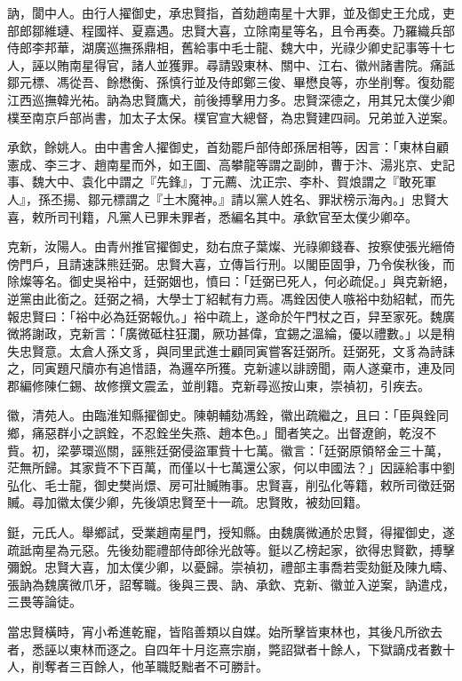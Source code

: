 \begin{pinyinscope}
訥，閬中人。由行人擢御史，承忠賢指，首劾趙南星十大罪，並及御史王允成，吏部郎鄒維璉、程國祥、夏嘉遇。忠賢大喜，立除南星等名，且令再奏。乃羅織兵部侍郎李邦華，湖廣巡撫孫鼎相，舊給事中毛士龍、魏大中，光祿少卿史記事等十七人，誣以賄南星得官，諸人並獲罪。尋請毀東林、關中、江右、徽州諸書院。痛詆鄒元標、馮從吾、餘懋衡、孫慎行並及侍郎鄭三俊、畢懋良等，亦坐削奪。復劾罷江西巡撫韓光祐。訥為忠賢鷹犬，前後搏擊用力多。忠賢深德之，用其兄太僕少卿樸至南京戶部尚書，加太子太保。樸官宣大總督，為忠賢建四祠。兄弟並入逆案。

承欽，餘姚人。由中書舍人擢御史，首劾罷戶部侍郎孫居相等，因言：「東林自顧憲成、李三才、趙南星而外，如王圖、高攀龍等謂之副帥，曹于汴、湯兆京、史記事、魏大中、袁化中謂之『先鋒』，丁元薦、沈正宗、李朴、賀烺謂之『敢死軍人』，孫丕揚、鄒元標謂之『土木魔神。』請以黨人姓名、罪狀榜示海內。」忠賢大喜，敕所司刊籍，凡黨人已罪未罪者，悉編名其中。承欽官至太僕少卿卒。

克新，汝陽人。由青州推官擢御史，劾右庶子葉燦、光祿卿錢春、按察使張光縉倚傍門戶，且請速誅熊廷弼。忠賢大喜，立傳旨行刑。以閣臣固爭，乃令俟秋後，而除燦等名。御史吳裕中，廷弼姻也，憤曰：「廷弼已死人，何必疏促。」與克新絕，逆黨由此銜之。廷弼之禍，大學士丁紹軾有力焉。馮銓因使人嗾裕中劾紹軾，而先報忠賢曰：「裕中必為廷弼報仇。」裕中疏上，遂命於午門杖之百，舁至家死。魏廣微將謝政，克新言：「廣微砥柱狂瀾，厥功甚偉，宜錫之溫綸，優以禮數。」以是稍失忠賢意。太倉人孫文豸，與同里武進士顧同寅嘗客廷弼所。廷弼死，文豸為詩誄之，同寅題尺牘亦有追惜語，為邏卒所獲。克新遽以誹謗聞，兩人遂棄市，連及同郡編修陳仁錫、故修撰文震孟，並削籍。克新尋巡按山東，崇禎初，引疾去。

徽，清苑人。由臨淮知縣擢御史。陳朝輔劾馮銓，徽出疏繼之，且曰：「臣與銓同鄉，痛惡群小之誤銓，不忍銓坐失燕、趙本色。」聞者笑之。出督遼餉，乾沒不貲。初，梁夢環巡關，誣熊廷弼侵盜軍貲十七萬。徽言：「廷弼原領帑金三十萬，茫無所歸。其家貲不下百萬，而僅以十七萬還公家，何以申國法？」因誣給事中劉弘化、毛士龍，御史樊尚燝、房可壯贓賄事。忠賢喜，削弘化等籍，敕所司徵廷弼贓。尋加徽太僕少卿，先後頌忠賢至十一疏。忠賢敗，被劾回籍。

鋌，元氏人。舉鄉試，受業趙南星門，授知縣。由魏廣微通於忠賢，得擢御史，遂疏詆南星為元惡。先後劾罷禮部侍郎徐光啟等。鋌以乙榜起家，欲得忠賢歡，搏擊彌銳。忠賢大喜，加太僕少卿，以憂歸。崇禎初，禮部主事喬若雯劾鋌及陳九疇、張訥為魏廣微爪牙，詔奪職。後與三畏、訥、承欽、克新、徽並入逆案，訥遣戍，三畏等論徒。

當忠賢橫時，宵小希進乾寵，皆陷善類以自媒。始所擊皆東林也，其後凡所欲去者，悉誣以東林而逐之。自四年十月迄熹宗崩，斃詔獄者十餘人，下獄謫戍者數十人，削奪者三百餘人，他革職貶黜者不可勝計。


\end{pinyinscope}
